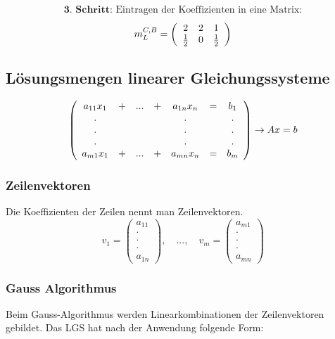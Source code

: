 \documentclass[12pt,a4paper]{report}%
\numberwithin{equation}{section}
\def\vecT#1{\left(\begin{array}{c} #1 \end{array}\right)}
\def\dddot{\cdot \\ \cdot \\ \cdot}
\def\vecDt#1#2{\vecT{#1 \\ \dddot \\ #2}}
\numberwithin{equation}{subsection}
\begin{document}
	    \begin{align*}
		     &\textbf{3. Schritt: } \text{Eintragen der Koeffizienten in eine Matrix:}& \nonumber 
		  \end{align*}
      \begin{align}
        m_L^{C,B} = \left(\begin{array}{c c c} 2 & 2 & 1 \\ \frac{1}{2} & 0 & \frac{1}{2} \end{array}\right)
      \end{align}        		   
		   
	    \subsection{Lösungsmengen linearer Gleichungssysteme}
	    \begin{align}
		    \left(
	      \begin{array}{c c c c c c c}
	      a_{11}x_1 & + &  ...   & + & a_{1n}x_n & =  & b_1\\
	      .         & \;& \;     & \;& .         & \; & . \\
	      .         & \;& \;     & \;& .         & \; & . \\
	      .         & \;& \;     & \;& .         & \; & . \\
	      a_{m1}x_1 & + & ...    & + & a_{mn}x_n & =  & b_m\\
	      \end{array}
	    \right) \rightarrow Ax = b   
	   \end{align} 
	   
	   \subsubsection{Zeilenvektoren}
	   Die Koeffizienten der Zeilen nennt man Zeilenvektoren.
	   \begin{equation}
	     v_1 = \vecDt{a_{11}}{a_{1n}}, \quad ..., \quad v_m = \vecDt{a_{m1}}{a_{mn}}
	   \end{equation}
	   
	   \subsubsection{Gauss Algorithmus}
	   Beim Gauss-Algorithmus werden Linearkombinationen der Zeilenvektoren gebildet. Das LGS hat nach der Anwendung folgende Form:
	   
\end{document}
